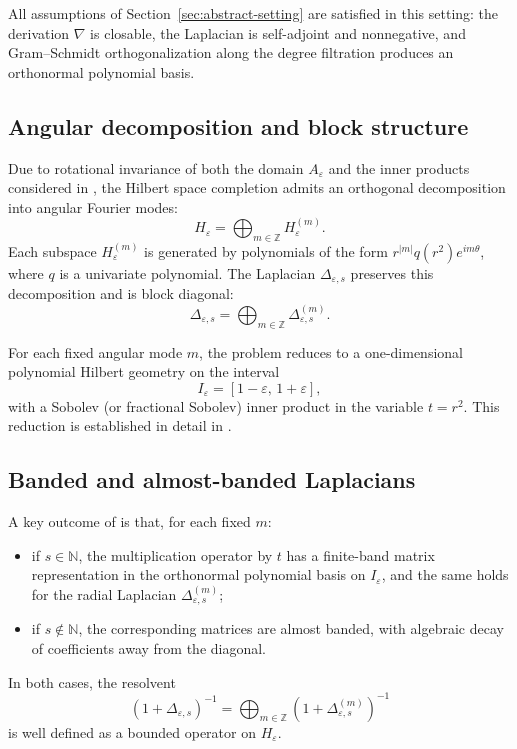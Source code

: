 \documentclass{amsart}
\numberwithin{equation}{section}
\theoremstyle{definition}
\theoremstyle{remark}
\begin{document}
All assumptions of Section~\ref{sec:abstract-setting} are satisfied in this setting:
the derivation $\nabla$ is closable, the Laplacian is self-adjoint and nonnegative,
and Gram--Schmidt orthogonalization along the degree filtration produces an orthonormal
polynomial basis.

\subsection{Angular decomposition and block structure}

Due to rotational invariance of both the domain $A_\varepsilon$ and the inner products
considered in \cite{MagnotThinAnnuli}, the Hilbert space completion admits an orthogonal
decomposition into angular Fourier modes:
\[
H_\varepsilon = \bigoplus_{m\in\mathbb Z} H_{\varepsilon}^{(m)}.
\]
Each subspace $H_{\varepsilon}^{(m)}$ is generated by polynomials of the form
$r^{|m|} q(r^2) e^{im\theta}$, where $q$ is a univariate polynomial.
The Laplacian $\Delta_{\varepsilon,s}$ preserves this decomposition and is block diagonal:
\[
\Delta_{\varepsilon,s}
=
\bigoplus_{m\in\mathbb Z} \Delta_{\varepsilon,s}^{(m)}.
\]

For each fixed angular mode $m$, the problem reduces to a one-dimensional polynomial
Hilbert geometry on the interval
\[
I_\varepsilon=[1-\varepsilon,\,1+\varepsilon],
\]
with a Sobolev (or fractional Sobolev) inner product in the variable $t=r^2$.
This reduction is established in detail in \cite{MagnotThinAnnuli}.

\subsection{Banded and almost-banded Laplacians}

A key outcome of \cite{MagnotThinAnnuli} is that, for each fixed $m$:

\begin{itemize}
  \item if $s\in\mathbb N$, the multiplication operator by $t$ has a finite-band matrix
  representation in the orthonormal polynomial basis on $I_\varepsilon$, and the same holds
  for the radial Laplacian $\Delta_{\varepsilon,s}^{(m)}$;
  \item if $s\notin\mathbb N$, the corresponding matrices are almost banded, with algebraic
  decay of coefficients away from the diagonal.
\end{itemize}

In both cases, the resolvent
\[
(1+\Delta_{\varepsilon,s})^{-1}
=
\bigoplus_{m\in\mathbb Z}(1+\Delta_{\varepsilon,s}^{(m)})^{-1}
\]
is well defined as a bounded operator on $H_\varepsilon$.
\end{document}
